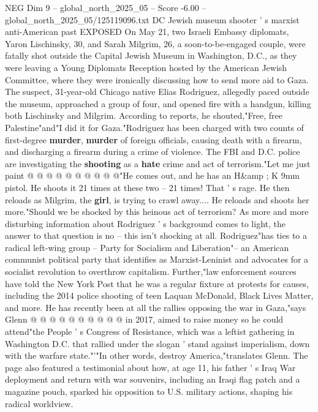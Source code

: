 \begin{textsample}{NEG Dim 9 – global\_north\_2025\_05 – Score -6.00 – global\_north\_2025\_05/125119096.txt}  \label{ex:f9_neg_176}
DC Jewish museum shooter ' s marxist anti-American past EXPOSED On May 21, two Israeli Embassy diplomats, Yaron Lischinsky, 30, and Sarah Milgrim, 26, a soon-to-be-engaged couple, were fatally shot outside the Capital Jewish Museum in Washington, D.C., as they were leaving a Young Diplomats Reception hosted by the American Jewish Committee, where they were ironically discussing how to send more aid to Gaza.
The suspect, 31-year-old Chicago native Elias Rodriguez, allegedly paced outside the museum, approached a group of four, and opened fire with a handgun, killing both Lischinsky and Milgrim.
According to reports, he shouted,"Free, free Palestine"and"I did it for Gaza."Rodriguez has been charged with two counts of first-degree \textbf{murder}, \textbf{murder} of foreign officials, causing death with a firearm, and discharging a firearm during a crime of violence.
The FBI and D.C. police are investigating the \textbf{shooting} as a \textbf{hate} crime and act of terrorism."Let me just paint @ @ @ @ @ @ @ @ @ @"He comes out, and he has an H\&amp ; K 9mm pistol.
He shoots it 21 times at these two -- 21 times!
That ' s rage.
He then reloads as Milgrim, the \textbf{girl}, is trying to crawl away....
He reloads and shoots her more."Should we be shocked by this heinous act of terrorism?
As more and more disturbing information about Rodriguez ' s background comes to light, the answer to that question is no -- this isn't shocking at all.
Rodriguez"has ties to a radical left-wing group -- Party for Socialism and Liberation"-- an American communist political party that identifies as Marxist-Leninist and advocates for a socialist revolution to overthrow capitalism.
Further,"law enforcement sources have told the New York Post that he was a regular fixture at protests for causes, including the 2014 police shooting of teen Laquan McDonald, Black Lives Matter, and more.
He has recently been at all the rallies opposing the war in Gaza,"says Glenn @ @ @ @ @ @ @ @ @ @ in 2017, aimed to raise money so he could attend"the People ' s Congress of Resistance, which was a leftist gathering in Washington D.C. that rallied under the slogan ' stand against imperialism, down with the warfare state."'"In other words, destroy America,"translates Glenn.
The page also featured a testimonial about how, at age 11, his father ' s Iraq War deployment and return with war souvenirs, including an Iraqi flag patch and a magazine pouch, sparked his opposition to U.S. military actions, shaping his radical worldview.

\end{textsample}
